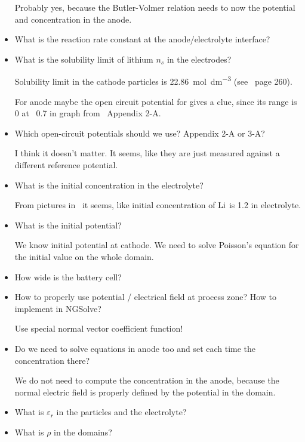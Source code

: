 \documentclass[a4paper,11pt]{scrartcl}
\newcommand*{\Li}{\ce{Li}}
\begin{document}
\begin{itemize}
  Probably yes, because the Butler-Volmer relation needs to now the potential
  and concentration in the anode.

\item What is the reaction rate constant at the anode/electrolyte interface?

\item What is the solubility limit of lithium $n_s$ in the electrodes?

  Solubility limit in the cathode particles is \SI{22.86}{\mol\dm^{-3}}
  (see~\cite{garcia05} page 260).

  For anode maybe the open circuit potential for  gives a clue,
  since its range is 0 at ~0.7 in graph from~\cite{doyle95} Appendix 2-A.

\item Which open-circuit potentials should we use? Appendix 2-A or 3-A?

  I think it doesn't matter.
  It seems, like they are just measured against a different reference potential.

\item What is the initial concentration in the electrolyte?

  From pictures in~\cite{garcia05} it seems, like initial concentration of $\Li$
  is \num{1.2} in electrolyte.

\item What is the initial potential?

  We know initial potential at cathode.
  We need to solve Poisson's equation for the initial value on the whole domain.

\item How wide is the battery cell?

\item How to properly use potential / electrical field at process zone?
  How to implement in NGSolve?

  Use special normal vector coefficient function!

\item Do we need to solve equations in anode too and set each time the concentration there?

  We do not need to compute the concentration in the anode, because the normal
  electric field is properly defined by the potential in the domain.

\item What is $\varepsilon_r$ in the particles and the electrolyte?

\item What is $\rho$ in the domains?


\end{itemize}
\end{document}
